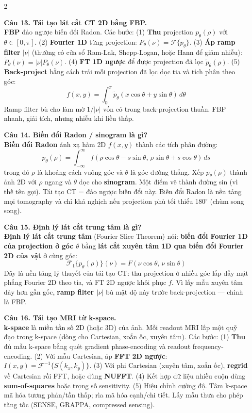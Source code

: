 \begin{paracol}{2}
\switchcolumn

\textbf{Câu 13. Tái tạo lát cắt CT 2D bằng FBP.}\\
\textbf{FBP} đảo ngược biến đổi Radon. Các bước: (1) \textbf{Thu} projection $p_\theta(\rho)$ với $\theta \in [0,\pi]$. (2) \textbf{Fourier 1D} từng projection: $P_\theta(\nu) = \mathcal{F}\{p_\theta\}$. (3) \textbf{Áp ramp filter} $|\nu|$ (thường có cửa sổ Ram-Lak, Shepp-Logan, hoặc Hann để giảm nhiễu): $\tilde{P}_\theta(\nu) = |\nu| P_\theta(\nu)$. (4) \textbf{FT 1D ngược} để được projection đã lọc $\tilde{p}_\theta(\rho)$. (5) \textbf{Back-project} bằng cách trải mỗi projection đã lọc dọc tia và tích phân theo góc:
$$f(x,y) = \int_0^\pi \tilde{p}_\theta(x\cos\theta + y\sin\theta)\,d\theta$$
Ramp filter bù cho làm mờ $1/|\nu|$ vốn có trong back-projection thuần. FBP nhanh, giải tích, nhưng nhiễu khi liều thấp.

\textbf{Câu 14. Biến đổi Radon / sinogram là gì?}\\
\textbf{Biến đổi Radon} ánh xạ hàm 2D $f(x,y)$ thành các tích phân đường:
$$p_\theta(\rho) = \int_{-\infty}^{\infty} f(\rho\cos\theta - s\sin\theta,\,\rho\sin\theta + s\cos\theta)\,ds$$
trong đó $\rho$ là khoảng cách vuông góc và $\theta$ là góc đường thẳng. Xếp $p_\theta(\rho)$ thành ảnh 2D với $\rho$ ngang và $\theta$ dọc cho \textbf{sinogram}. Một điểm vẽ thành đường sin (vì thế tên gọi). Tái tạo CT = đảo ngược biến đổi này. Biến đổi Radon là nền tảng mọi tomography và chỉ khả nghịch nếu projection phủ tối thiểu 180$^\circ$ (chùm song song).

\textbf{Câu 15. Định lý lát cắt trung tâm là gì?}\\
\textbf{Định lý lát cắt trung tâm} (Fourier Slice Theorem) nói: \textbf{biến đổi Fourier 1D của projection ở góc $\theta$} bằng \textbf{lát cắt xuyên tâm 1D qua biến đổi Fourier 2D của vật} ở cùng góc:
$$\mathcal{F}_1\{p_\theta(\rho)\}(\nu) = F(\nu\cos\theta,\,\nu\sin\theta)$$
Đây là nền tảng lý thuyết của tái tạo CT: thu projection ở nhiều góc lấp đầy mặt phẳng Fourier 2D theo tia, và FT 2D ngược khôi phục $f$. Vì lấy mẫu xuyên tâm dày hơn gần gốc, \textbf{ramp filter $|\nu|$} bù mật độ này trước back-projection --- chính là FBP.

\textbf{Câu 16. Tái tạo MRI từ k-space.}\\
\textbf{k-space} là miền tần số 2D (hoặc 3D) của ảnh. Mỗi readout MRI lấp một quỹ đạo trong k-space (dòng cho Cartesian, xoắn ốc, xuyên tâm). Các bước: (1) \textbf{Thu} đủ mẫu k-space bằng quét gradient phase-encoding và readout frequency-encoding. (2) Với mẫu Cartesian, áp \textbf{FFT 2D ngược}: $I(x,y) = \mathcal{F}^{-1}\{S(k_x,k_y)\}$. (3) Với phi Cartesian (xuyên tâm, xoắn ốc), \textbf{regrid} về Cartesian rồi FFT, hoặc dùng \textbf{NUFFT}. (4) Kết hợp dữ liệu nhiều cuộn dùng \textbf{sum-of-squares} hoặc trọng số sensitivity. (5) Hiệu chỉnh cường độ. Tâm k-space mã hóa tương phản/tần thấp; rìa mã hóa cạnh/chi tiết. Lấy mẫu thưa cho phép tăng tốc (SENSE, GRAPPA, compressed sensing).


\end{paracol}
